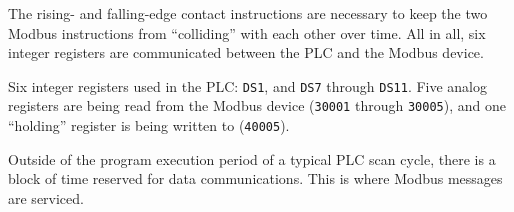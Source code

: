 





The rising- and falling-edge contact instructions are necessary to keep the two Modbus instructions from ``colliding'' with each other over time.  All in all, six integer registers are communicated between the PLC and the Modbus device.
 






Six integer registers used in the PLC: {\tt DS1}, and {\tt DS7} through {\tt DS11}.  Five analog registers are being read from the Modbus device ({\tt 30001} through {\tt 30005}), and one ``holding'' register is being written to ({\tt 40005}).

\vskip 10pt

Outside of the program execution period of a typical PLC scan cycle, there is a block of time reserved for data communications.  This is where Modbus messages are serviced.




